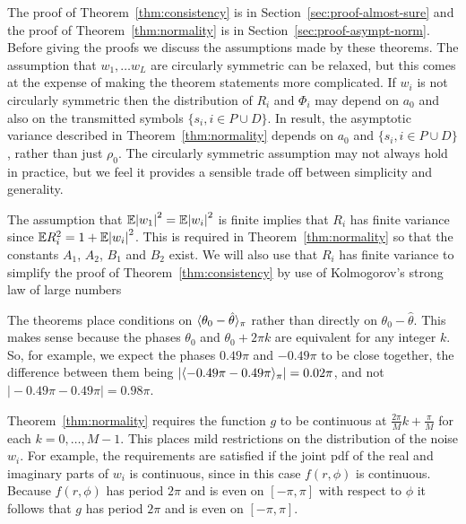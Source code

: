 \documentclass[journal]{IEEEtran}
\begin{document}
The proof of Theorem~\ref{thm:consistency} is in Section~\ref{sec:proof-almost-sure} and the proof of Theorem~\ref{thm:normality} is in Section~\ref{sec:proof-asympt-norm}.  Before giving the proofs we discuss the assumptions made by these theorems.  The assumption that $w_1, \dots w_L$ are circularly symmetric can be relaxed, but this comes at the expense of making the theorem statements more complicated.  If $w_i$ is not circularly symmetric then the distribution of $R_i$ and $\Phi_i$ may depend on $a_0$ and also on the transmitted symbols $\{s_i,i \in P \cup D\}$.  In result, the asymptotic variance described in Theorem~\ref{thm:normality} depends on $a_0$ and $\{s_i,i \in P \cup D\}$, rather than just $\rho_0$.  The circularly symmetric assumption may not always hold in practice, but we feel it provides a sensible trade off between simplicity and generality.  

The assumption that ${\mathbb E} {\vert w_1 \vert}^2 = {\mathbb E} {\vert w_i \vert}^2$ is finite implies that $R_i$ has finite variance since ${\mathbb E} R_i^2 = 1 + {\mathbb E} {\left\vert w_i \right\vert}^2$.  This is required in Theorem~\ref{thm:normality} so that the constants $A_1$, $A_2$, $B_1$ and $B_2$ exist.  We will also use that $R_i$ has finite variance to simplify the proof of Theorem~\ref{thm:consistency} by use of Kolmogorov's strong law of large numbers~\cite[Theorem 2.3.10]{SenSinger_large_sample_stats_1993}

The theorems place conditions on $\langle \theta_0 - \hat{\theta} \rangle_\pi$ rather than directly on $\theta_0 - \hat{\theta}$.  This makes sense because the phases $\theta_0$ and $\theta_0 + 2\pi k$ are equivalent for any integer $k$. So, for example, we expect the phases $0.49\pi$ and $-0.49\pi$ to be close together, the difference between them being $\vert\langle -0.49\pi - 0.49\pi \rangle_\pi\vert = 0.02\pi$, and not $\vert -0.49\pi - 0.49\pi\vert = 0.98\pi$.

Theorem~\ref{thm:normality} requires the function $g$ to be continuous at $\tfrac{2\pi}{M}k + \tfrac{\pi}{M}$ for each $k = 0, \dots, M-1$.  This places mild restrictions on the distribution of the noise $w_i$.  For example, the requirements are satisfied if the joint pdf of the real and imaginary parts of $w_i$ is continuous, since in this case $f(r,\phi)$ is continuous.  Because $f(r,\phi)$ has period $2\pi$ and is even on $[-\pi,\pi]$ with respect to $\phi$ it follows that $g$ has period $2\pi$ and is even on $[-\pi, \pi]$.

\end{document}
